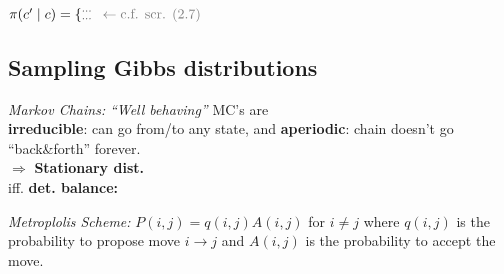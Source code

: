 $\pi(c'\mid c) = \{ \substack{\cdots\\\cdots} \enskip\color{gray} \leftarrow \text{c.f. scr. (2.7)}$

\iffalse
    \subsection{Sampling Gibbs distributions}
    
    \emph{Markov Chains:}
    \textit{``Well behaving''} MC's are\\
    \textbf{irreducible}: can go from/to any state, and
    \textbf{aperiodic}: chain doesn't go ``back\&forth'' forever. %
    \\$\Rightarrow$
    \textbf{Stationary dist.} \\ %
    iff. \textbf{det. balance:}  %
    
    \emph{Metroplolis Scheme:}
    $P(i,j) = q(i,j) A(i,j)$ for $i\neq j$ where $q(i,j)$ is the probability to propose move $i\to j$ and $A(i,j)$ is the probability to accept the move.
    
